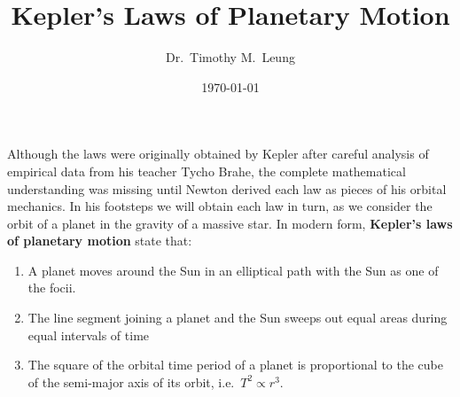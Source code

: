 \documentclass[11pt]{article}
\title{Kepler's Laws of Planetary Motion}
\author{Dr.\ Timothy M.\ Leung}
\date{\today}
\begin{document}
\maketitle

%
Although the laws were originally obtained by Kepler after careful analysis of
empirical data from his teacher Tycho Brahe, the complete mathematical
understanding was missing until Newton derived each law as pieces of his
orbital mechanics. In his footsteps we will obtain each law in turn, as we
consider the orbit of a planet in the gravity of a massive star. In modern
form, \textbf{Kepler's laws of planetary motion} state that:
\begin{enumerate}[leftmargin=18pt]
\item A planet moves around the Sun in an elliptical path with the Sun as one
  of the focii.
\item The line segment joining a planet and the Sun sweeps out equal areas
  during equal intervals of time
\item The square of the orbital time period of a planet is proportional to the
  cube of the semi-major axis of its orbit, i.e.\ $T^2\propto r^3$.
\end{enumerate}
\end{document}
